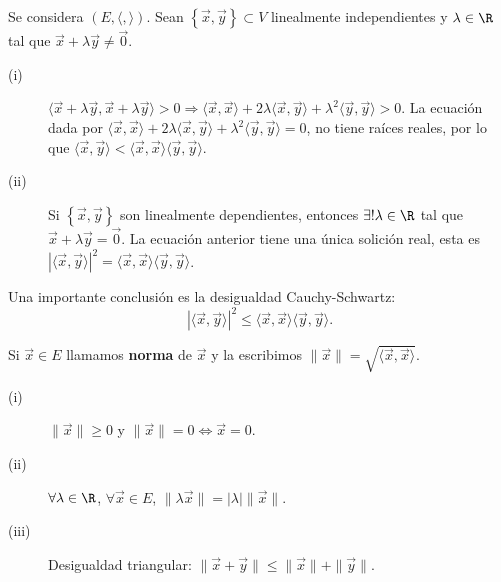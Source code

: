 \begin{observation}
	\normalfont Se considera $\displaystyle \left(E, \langle,\rangle \right) $. Sean $\displaystyle \left\{ \vec{x}, \vec{y}\right\} \subset V $ linealmente independientes y $\displaystyle \lambda \in \R $ tal que $\displaystyle \vec{x} + \lambda \vec{y} \neq \vec{0} $. 
	\begin{description}
	\item[(i)] $\displaystyle \langle \vec{x} + \lambda \vec{y}, \vec{x} + \lambda \vec{y} \rangle > 0 \Rightarrow \langle \vec{x}, \vec{x} \rangle + 2\lambda \langle \vec{x}, \vec{y}\rangle + \lambda ^{2}\langle \vec{y}, \vec{y} \rangle >0$. La ecuación dada por $\displaystyle \langle \vec{x}, \vec{x} \rangle + 2\lambda \langle \vec{x}, \vec{y} \rangle + \lambda^{2} \langle \vec{y}, \vec{y} \rangle = 0 $, no tiene raíces reales, por lo que $\displaystyle \langle \vec{x}, \vec{y}\rangle < \langle \vec{x}, \vec{x} \rangle \langle \vec{y}, \vec{y} \rangle  $.
	\item[(ii)] Si $\displaystyle \left\{ \vec{x}, \vec{y}\right\}  $ son linealmente dependientes, entonces $\displaystyle \exists ! \lambda \in \R $ tal que $\displaystyle \vec{x} + \lambda \vec{y} = \vec{0} $. La ecuación anterior tiene una única solición real, esta es $\displaystyle \left|\langle \vec{x}, \vec{y} \rangle \right|^{2} = \langle \vec{x}, \vec{x} \rangle \langle \vec{y}, \vec{y} \rangle $.
	\end{description}
\end{observation}
\begin{observation}
\normalfont Una importante conclusión es la desigualdad Cauchy-Schwartz:
\[ \left|\langle \vec{x}, \vec{y}\rangle \right|^{2} \leq \langle\vec{x},\vec{x}\rangle\langle\vec{y},\vec{y}\rangle .\]
\end{observation}
\begin{fdefinition}[Norma]
\normalfont Si $\displaystyle \vec{x} \in E $ llamamos \textbf{norma} de $\displaystyle \vec{x} $ y la escribimos $\displaystyle \| \vec{x} \| = \sqrt{\langle \vec{x}, \vec{x}\rangle } $.
\end{fdefinition}
\begin{fprop}[]
\normalfont 
\begin{description}
\item[(i)] $\displaystyle \|\vec{x}\| \geq 0 $ y $\displaystyle \| \vec{x} \| = 0 \iff \vec{x} = 0 $. 
\item[(ii)] $\displaystyle \forall \lambda \in \R $, $\displaystyle \forall \vec{x} \in E $, $\displaystyle \| \lambda \vec{x} \| = \left|\lambda \right| \| \vec{x} \| $.
\item[(iii)] Desigualdad triangular: $\displaystyle \| \vec{x} + \vec{y} \| \leq \| \vec{x} \| + \| \vec{y}\| $. 
\end{description}
\end{fprop}

